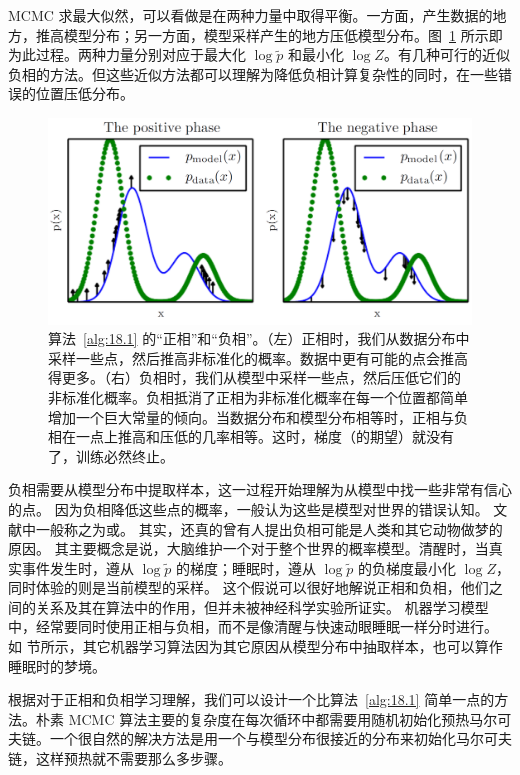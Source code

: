 MCMC 求最大似然，可以看做是在两种力量中取得平衡。一方面，产生数据的地方，推高模型分布；另一方面，模型采样产生的地方压低模型分布。图~\ref{fig:18.1} 所示即为此过程。两种力量分别对应于最大化 \(\log\widetilde{p}\) 和最小化 \(\log Z\)。有几种可行的近似负相的方法。但这些近似方法都可以理解为降低负相计算复杂性的同时，在一些错误的位置压低分布。

\begin{figure}[htbp] %
   \centering
   \includegraphics[width=\textwidth]{fig/chap18/18_1.png} 
   \caption{算法~\ref{alg:18.1} 的``正相''和``负相''。（左）正相时，我们从数据分布中采样一些点，然后推高非标准化的概率。数据中更有可能的点会推高得更多。（右）负相时，我们从模型中采样一些点，然后压低它们的非标准化概率。负相抵消了正相为非标准化概率在每一个位置都简单增加一个巨大常量的倾向。当数据分布和模型分布相等时，正相与负相在一点上推高和压低的几率相等。这时，梯度（的期望）就没有了，训练必然终止。}
   \label{fig:18.1}
\end{figure}

负相需要从模型分布中提取样本，这一过程开始理解为从模型中找一些非常有信心的点。
因为负相降低这些点的概率，一般认为这些是模型对世界的错误认知。
文献中一般称之为或。
其实，还真的曾有人提出负相可能是人类和其它动物做梦的原因。
其主要概念是说，大脑维护一个对于整个世界的概率模型。清醒时，当真实事件发生时，遵从 \(\log\widetilde{p}\) 的梯度；睡眠时，遵从 \(\log\widetilde{p}\) 的负梯度最小化 \(\log Z\)，同时体验的则是当前模型的采样。
这个假说可以很好地解说正相和负相，他们之间的关系及其在算法中的作用，但并未被神经科学实验所证实。
机器学习模型中，经常要同时使用正相与负相，而不是像清醒与快速动眼睡眠一样分时进行。
如  节所示，其它机器学习算法因为其它原因从模型分布中抽取样本，也可以算作睡眠时的梦境。

根据对于正相和负相学习理解，我们可以设计一个比算法~\ref{alg:18.1} 简单一点的方法。朴素 MCMC 算法主要的复杂度在每次循环中都需要用随机初始化预热马尔可夫链。一个很自然的解决方法是用一个与模型分布很接近的分布来初始化马尔可夫链，这样预热就不需要那么多步骤。

